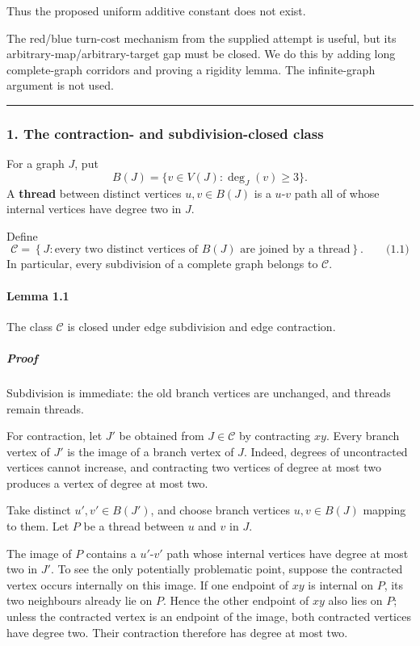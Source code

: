 \documentclass[
  11pt,
  a4paper,
]{article}
\begin{document}
Thus the proposed uniform additive constant does not exist.

The red/blue turn-cost mechanism from the supplied attempt is useful,
but its arbitrary-map/arbitrary-target gap must be closed. We do this by
adding long complete-graph corridors and proving a rigidity lemma. The
infinite-graph argument is not used.

\begin{center}\rule{0.5\linewidth}{0.5pt}\end{center}

\subsubsection{1. The contraction- and subdivision-closed
class}\label{the-contraction--and-subdivision-closed-class}

For a graph \(J\), put \[
B(J)=\{v\in V(J):\deg_J(v)\ge 3\}.
\] A \textbf{thread} between distinct vertices \(u,v\in B(J)\) is a
\(u\)-\(v\) path all of whose internal vertices have degree two in
\(J\).

Define \[
\mathcal C=
\left\{
J:\text{every two distinct vertices of }B(J)
\text{ are joined by a thread}
\right\}.
\qquad\text{(1.1)}
\] In particular, every subdivision of a complete graph belongs to
\(\mathcal C\).

\paragraph{Lemma 1.1}\label{lemma-1.1}

The class \(\mathcal C\) is closed under edge subdivision and edge
contraction.

\subparagraph{Proof}\label{proof}

Subdivision is immediate: the old branch vertices are unchanged, and
threads remain threads.

For contraction, let \(J'\) be obtained from \(J\in\mathcal C\) by
contracting \(xy\). Every branch vertex of \(J'\) is the image of a
branch vertex of \(J\). Indeed, degrees of uncontracted vertices cannot
increase, and contracting two vertices of degree at most two produces a
vertex of degree at most two.

Take distinct \(u',v'\in B(J')\), and choose branch vertices
\(u,v\in B(J)\) mapping to them. Let \(P\) be a thread between \(u\) and
\(v\) in \(J\).

The image of \(P\) contains a \(u'\)-\(v'\) path whose internal vertices
have degree at most two in \(J'\). To see the only potentially
problematic point, suppose the contracted vertex occurs internally on
this image. If one endpoint of \(xy\) is internal on \(P\), its two
neighbours already lie on \(P\). Hence the other endpoint of \(xy\) also
lies on \(P\); unless the contracted vertex is an endpoint of the image,
both contracted vertices have degree two. Their contraction therefore
has degree at most two.
\end{document}
